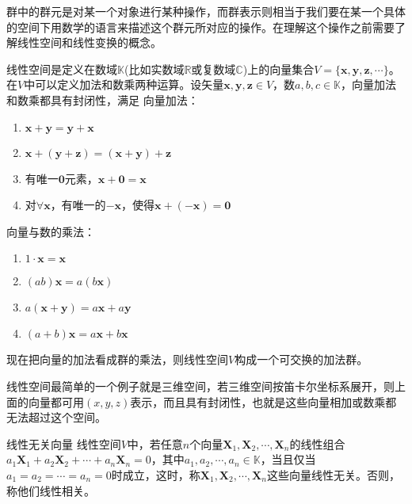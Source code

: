 群中的群元是对某一个对象进行某种操作，而群表示则相当于我们要在某一个具体的空间下用数学的语言来描述这个群元所对应的操作。在理解这个操作之前需要了解线性空间和线性变换的概念。
\begin{definition}
	线性空间是定义在数域$\mathbb{K}$(比如实数域$\mathbb{R}$或复数域$\mathbb{C}$)上的向量集合$V = \{\bm{x}, \bm{y}, \bm{z}, \cdots\}$。在$V$中可以定义加法和数乘两种运算。设矢量$\bm{x}, \bm{y}, \bm{z} \in V$，数$a , b , c \in \mathbb{K}$，向量加法和数乘都具有封闭性，满足\newline
	向量加法：
	\begin{enumerate}
		\item $\bm{x} + \bm{y} = \bm{y} + \bm{x}$
		\item $\bm{x} + ( \bm{y} + \bm{z} ) = (\bm{x} + \bm{y}) + \bm{z}$
		\item 有唯一$\bm{0}$元素，$\bm{x} + \bm{0} = \bm{x}$
		\item 对$\forall \bm{x}$，有唯一的$-\bm{x}$，使得$\bm{x} + (-\bm{x}) = \bm{0}$
	\end{enumerate}
	向量与数的乘法：
	\begin{enumerate}
		\item $1 \cdot \bm{x} = \bm{x}$
		\item $(ab)\bm{x} = a(b\bm{x})$
		\item $a(\bm{x} + \bm{y}) = a\bm{x} + a\bm{y}$
		\item $(a + b) \bm{x} = a\bm{x} + b\bm{x}$
	\end{enumerate}
	现在把向量的加法看成群的乘法，则线性空间$V$构成一个可交换的加法群。
\end{definition} 
线性空间最简单的一个例子就是三维空间，若三维空间按笛卡尔坐标系展开，则上面的向量都可用$(x, y, z)$表示，而且具有封闭性，也就是这些向量相加或数乘都无法超过这个空间。
\begin{definition}{线性无关向量}
	线性空间$V$中，若任意$n$个向量$\bm{X}_1, \bm{X}_2, \cdots, \bm{X}_n$的线性组合$a_1\bm{X}_1 + a_2\bm{X}_2 + \cdots + a_n\bm{X}_n = 0$，其中$a_1, a_2, \cdots, a_n \in \mathbb{K}$，当且仅当$a_1 = a_2 = \cdots = a_n = 0$时成立，这时，称$\bm{X}_1, \bm{X}_2, \cdots, \bm{X}_n$这些向量线性无关。否则，称他们线性相关。
\end{definition} 

